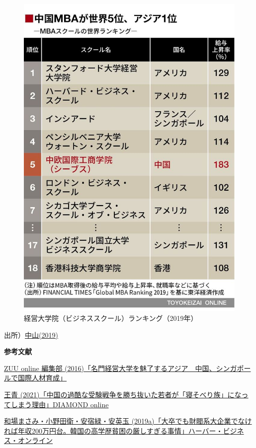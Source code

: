 \documentclass[
]{book}
\begin{document}
\begin{figure}
\includegraphics[width=480px]{mba} \caption{経営大学院（ビジネススクール）ランキング（2019年）}\label{fig:busschool}
\end{figure}

出所）\href{https://toyokeizai.net/articles/-/278811}{中山(2019)}

{\textbf{参考文献}}

\href{https://zuuonline.com/archives/120859}{ZUU online 編集部 (2016)「名門経営大学を魅了するアジア　中国、シンガポールで国際人材育成」}

\href{https://diamond.jp/articles/-/277433}{王青 (2021)「中国の過酷な受験戦争を勝ち抜いた若者が「寝そべり族」になってしまう理由」DIAMOND online}

\href{https://hbol.jp/pc/189601/}{和場まさみ・小野田衛・安宿緑・安英玉 (2019a)「大卒でも財閥系大企業でなければ年収200万円台。韓国の高学歴貧困の厳しすぎる事情」ハーバー・ビジネス・オンライン}
\end{document}
